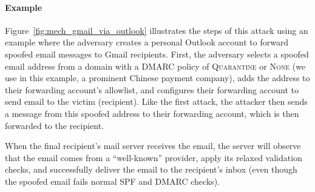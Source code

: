 \paragraph{Example}
Figure~\ref{fig:mech_gmail_via_outlook} illustrates the steps of this
attack using an example where the adversary creates a personal Outlook
account to forward spoofed email messages to Gmail recipients.  First,
the adversary selects a spoofed email address from a domain with a
DMARC policy of \textsc{Quarantine} or \textsc{None} (we use  in this example, a prominent Chinese payment company), adds the address
to their forwarding account's allowlist, and configures their
forwarding account to send email to the victim (recipient).  Like the
first attack, the attacker then sends a message from this spoofed address
to their forwarding account, which is then forwarded to the recipient.

When the final recipient's mail server receives
the email, the server will observe that the email comes from a
``well-known'' provider, apply its relaxed validation checks, and
successfully deliver the email to the recipient's inbox (even though
the spoofed email fails normal SPF and DMARC checks).


